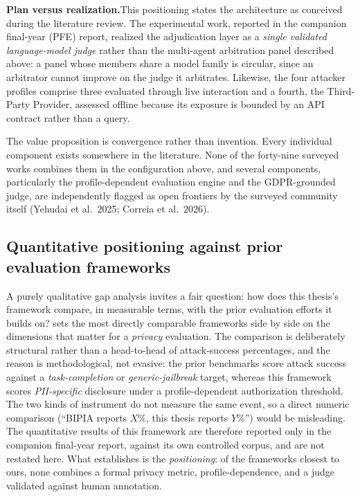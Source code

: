 \documentclass[12pt,a4paper]{report}
\begin{document}
\begin{notebox}
\textbf{Plan versus realization.}\quad This positioning states the architecture as conceived during the literature review. The experimental work, reported in the companion final-year (PFE) report, realized the adjudication layer as a \emph{single validated language-model judge} rather than the multi-agent arbitration panel described above: a panel whose members share a model family is circular, since an arbitrator cannot improve on the judge it arbitrates. Likewise, the four attacker profiles comprise three evaluated through live interaction and a fourth, the Third-Party Provider, assessed offline because its exposure is bounded by an API contract rather than a query.
\end{notebox}

\enlargethispage{2\baselineskip}%
The value proposition is convergence rather than invention. Every individual component exists somewhere in the literature. None of the forty-nine surveyed works combines them in the configuration above, and several components, particularly the profile-dependent evaluation engine and the GDPR-grounded judge, are independently flagged as open frontiers by the surveyed community itself (Yehudai et al.\ 2025; Correia et al.\ 2026).

\subsection{Quantitative positioning against prior evaluation frameworks}
\label{sec:comparative-quant}

A purely qualitative gap analysis invites a fair question: how does this thesis's framework compare,
in measurable terms, with the prior evaluation efforts it builds on?  sets the
most directly comparable frameworks side by side on the dimensions that matter for a \emph{privacy}
evaluation. The comparison is deliberately structural rather than a head-to-head of attack-success
percentages, and the reason is methodological, not evasive: the prior benchmarks score attack success
against a \emph{task-completion} or \emph{generic-jailbreak} target, whereas this framework scores
\emph{PII-specific} disclosure under a profile-dependent authorization threshold. The two kinds of
instrument do not measure the same event, so a direct numeric comparison (``BIPIA reports $X\%$,
this thesis reports $Y\%$'') would be misleading. The quantitative results of this framework are
therefore reported only in the companion final-year report, against its own controlled corpus, and
are not restated here. What  establishes is the \emph{positioning}: of the
frameworks closest to ours, none combines a formal privacy metric, profile-dependence, and a judge
validated against human annotation.
\end{document}
